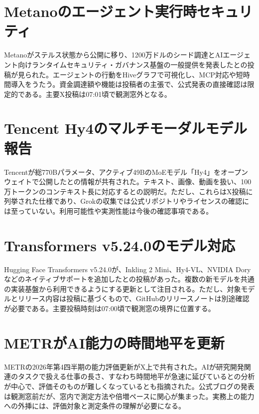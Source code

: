 \section{Metanoのエージェント実行時セキュリティ}
Metanoがステルス状態から公開に移り、1200万ドルのシード調達とAIエージェント向けランタイムセキュリティ・ガバナンス基盤の一般提供を発表したとの投稿が見られた。エージェントの行動をHiveグラフで可視化し、MCP対応や短時間導入をうたう。資金調達額や機能は投稿者の主張で、公式発表の直接確認は限定的である。主要X投稿は07:01頃で観測窓外となる。

\section{Tencent Hy4のマルチモーダルモデル報告}
Tencentが総770Bパラメータ、アクティブ49BのMoEモデル「Hy4」をオープンウェイトで公開したとの情報が共有された。テキスト、画像、動画を扱い、100万トークンのコンテキスト長に対応するとの説明だ。ただし、これらはX投稿に列挙された仕様であり、Grokの収集では公式リポジトリやライセンスの確認には至っていない。利用可能性や実測性能は今後の確認事項である。

\section{Transformers v5.24.0のモデル対応}
Hugging Face Transformers v5.24.0が、Inkling 2 Mini、Hy4-VL、NVIDIA Doryなどのネイティブサポートを追加したとの投稿があった。複数の新モデルを共通の実装基盤から利用できるようにする更新として注目される。ただし、対象モデルとリリース内容は投稿に基づくもので、GitHubのリリースノートは別途確認が必要である。主要投稿時刻は07:00頃で観測窓の境界に位置する。

\section{METRがAI能力の時間地平を更新}
METRの2026年第4四半期の能力評価更新がX上で共有された。AIが研究開発関連のタスクで扱える仕事の長さ、すなわち時間地平が急速に延びているとの分析が中心で、評価そのものが難しくなっているとも指摘された。公式ブログの発表は観測窓前だが、窓内で測定方法や倍増ペースに関心が集まった。実務上の能力への外挿には、評価対象と測定条件の理解が必要になる。

